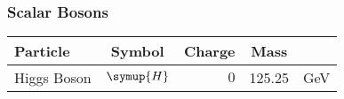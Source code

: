 \documentclass[fleqn]{NotesClass}
\newcommand{\Pparticle}[1]{\symup{#1}}
\newcommand{\PH}{\ensuremath{\Pparticle{H}}}
\begin{document}
\begin{appendices}
        \subsubsection{Scalar Bosons}
        \begin{center}
            \begin{tabular}{lcrSl}\toprule
                Particle & Symbol & Charge & Mass & \\ \hline
                Higgs Boson & \PH & \(0\) & 125.25 & \si{\giga\electronvolt} \\
                \bottomrule
            \end{tabular}
        \end{center}
    \end{appendices}
    
    \backmatter
    \renewcommand{\glossaryname}{Acronyms}
    \printglossary[acronym]
    \printindex
\end{document}
